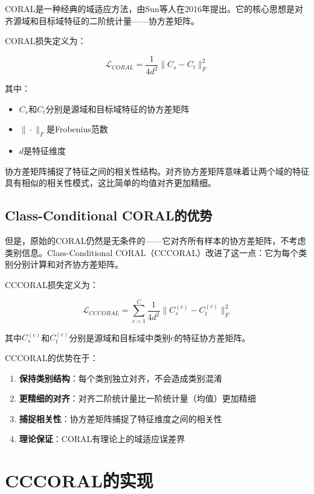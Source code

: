 \documentclass[12pt,a4paper]{ctexart}
\begin{document}
CORAL是一种经典的域适应方法，由Sun等人在2016年提出。它的核心思想是对齐源域和目标域特征的二阶统计量——协方差矩阵。

CORAL损失定义为：

\begin{equation}
\mathcal{L}_{CORAL} = \frac{1}{4d^2}\|C_s - C_t\|_F^2
\end{equation}

其中：
\begin{itemize}
    \item $C_s$和$C_t$分别是源域和目标域特征的协方差矩阵
    \item $\|\cdot\|_F$是Frobenius范数
    \item $d$是特征维度
\end{itemize}

协方差矩阵捕捉了特征之间的相关性结构。对齐协方差矩阵意味着让两个域的特征具有相似的相关性模式，这比简单的均值对齐更加精细。

\subsection{Class-Conditional CORAL的优势}

但是，原始的CORAL仍然是无条件的——它对齐所有样本的协方差矩阵，不考虑类别信息。Class-Conditional CORAL（CCCORAL）改进了这一点：它为每个类别分别计算和对齐协方差矩阵。

CCCORAL损失定义为：

\begin{equation}
\mathcal{L}_{CCCORAL} = \sum_{c=1}^{C} \frac{1}{4d^2}\|C_s^{(c)} - C_t^{(c)}\|_F^2
\end{equation}

其中$C_s^{(c)}$和$C_t^{(c)}$分别是源域和目标域中类别$c$的特征协方差矩阵。

CCCORAL的优势在于：

\begin{enumerate}
    \item \textbf{保持类别结构}：每个类别独立对齐，不会造成类别混淆
    \item \textbf{更精细的对齐}：对齐二阶统计量比一阶统计量（均值）更加精细
    \item \textbf{捕捉相关性}：协方差矩阵捕捉了特征维度之间的相关性
    \item \textbf{理论保证}：CORAL有理论上的域适应误差界
\end{enumerate}

\section{CCCORAL的实现}
\end{document}
